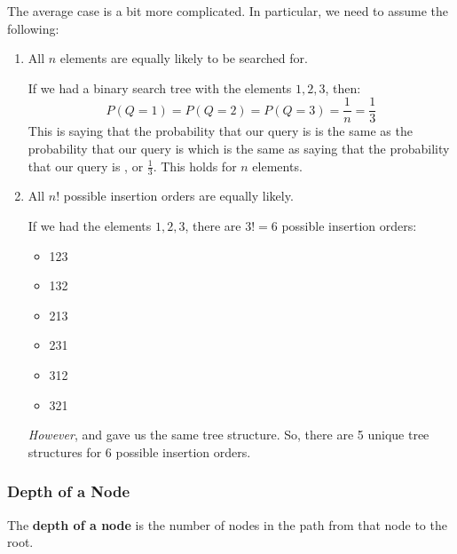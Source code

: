 \documentclass[letterpaper]{article}
\begin{document}
The average case is a bit more complicated. In particular, we need to assume the following:
\begin{enumerate}
    \item All $n$ elements are equally likely to be searched for. 
    
    \bigskip 

    If we had a binary search tree with the elements $1, 2, 3$, then: 
    \[P(Q = 1) = P(Q = 2) = P(Q = 3) = \frac{1}{n} = \frac{1}{3}\]
    This is saying that the probability that our query is  is the same as the probability that our query is  which is the same as saying that the probability that our query is , or $\frac{1}{3}$. This holds for $n$ elements. 

    \item All $n!$ possible insertion orders are equally likely. 
    
    \bigskip 

    If we had the elements $1, 2, 3$, there are $3! = 6$ possible insertion orders: 
    \begin{itemize}
        \item 123 
        \item 132 
        \item 213
        \item 231
        \item 312
        \item 321 
    \end{itemize}
    \emph{However},  and  gave us the same tree structure. So, there are 5 unique tree structures for 6 possible insertion orders. 
\end{enumerate}

\subsubsection{Depth of a Node}
The \textbf{depth of a node} is the number of nodes in the path from that node to the root. 

\bigskip 
\end{document}
